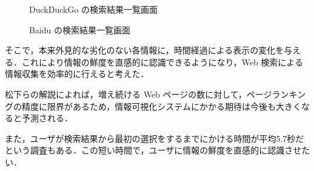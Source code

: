 \begin{figure}[htbp]
  \begin{minipage}{0.5\hsize}
    \begin{center}
    \end{center}
    \caption{DuckDuckGo の検索結果一覧画面}
  \end{minipage}
  \begin{minipage}{0.5\hsize}
    \begin{center}
    \end{center}
    \caption{Baidu の検索結果一覧画面}
  \end{minipage}
\end{figure}

そこで，本来外見的な劣化のない各情報に，時間経過による表示の変化を与える．これにより情報の鮮度を直感的に認識できるようになり，Web 検索による情報収集を効率的に行えると考えた．

松下\cite{tecvisinfo}らの解説によれば，増え続ける Web ページの数に対して，ページランキングの精度に限界があるため，情報可視化システムにかかる期待は今後も大きくなると予測される．

また，ユーザが検索結果から最初の選択をするまでにかける時間が平均5.7秒だという調査もある\cite{pinball}．この短い時間で，ユーザに情報の鮮度を直感的に認識させたい．

